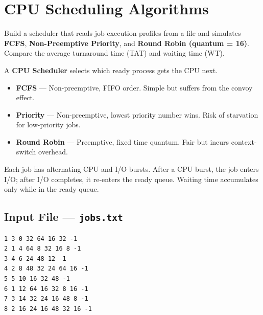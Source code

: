 \documentclass[11pt,a4paper]{article}
\begin{document}
\newpage

\section{CPU Scheduling Algorithms}

\begin{questionbox}
Build a scheduler that reads job execution profiles from a file and simulates \textbf{FCFS}, \textbf{Non-Preemptive Priority}, and \textbf{Round Robin (quantum = 16)}. Compare the average turnaround time (TAT) and waiting time (WT).
\end{questionbox}

\begin{theorybox}
A \textbf{CPU Scheduler} selects which ready process gets the CPU next.
\begin{itemize}[nosep]
    \item \textbf{FCFS} --- Non-preemptive, FIFO order. Simple but suffers from the convoy effect.
    \item \textbf{Priority} --- Non-preemptive, lowest priority number wins. Risk of starvation for low-priority jobs.
    \item \textbf{Round Robin} --- Preemptive, fixed time quantum. Fair but incurs context-switch overhead.
\end{itemize}
Each job has alternating CPU and I/O bursts. After a CPU burst, the job enters I/O; after I/O completes, it re-enters the ready queue. Waiting time accumulates only while in the ready queue.
\end{theorybox}

\subsection*{Input File --- \texttt{jobs.txt}}
\begin{codebox}
\begin{lstlisting}[style=outputstyle]
1 3 0 32 64 16 32 -1
2 1 4 64 8 32 16 8 -1
3 4 6 24 48 12 -1
4 2 8 48 32 24 64 16 -1
5 5 10 16 32 48 -1
6 1 12 64 16 32 8 16 -1
7 3 14 32 24 16 48 8 -1
8 2 16 24 16 48 32 16 -1
\end{lstlisting}
\end{codebox}
\end{document}
